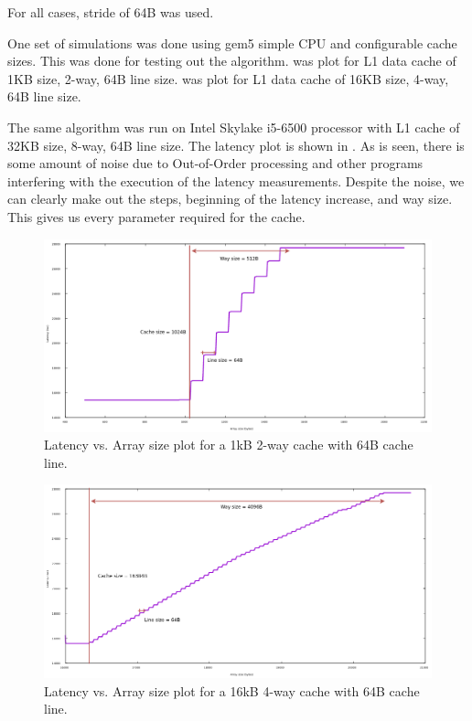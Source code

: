 For all cases, stride of 64B was used.

One set of simulations was done using gem5 simple CPU and configurable cache sizes. This was done for testing out
the algorithm.  was plot for L1 data cache of 1KB size, 2-way, 64B line size. 
was plot for L1 data cache of 16KB size, 4-way, 64B line size.

The same algorithm was run on Intel Skylake i5-6500 processor with L1 cache of 32KB size, 8-way, 64B line size. The latency
plot is shown in . As is seen, there is some amount of noise due to Out-of-Order processing and
other programs interfering with the execution of the latency measurements. Despite the noise, we can clearly make out
the steps, beginning of the latency increase, and way size. This gives us every parameter required for the cache.

\begin{figure}[h]
\centering
\includegraphics[width=\textwidth]{reverse_eng_1kb}
\caption[1KB cache stride access]{Latency vs. Array size plot for a 1kB 2-way cache with 64B cache line.}
\label{fig:gem5_cache}
\end{figure}

\begin{figure}[h]
\centering
\includegraphics[width=\textwidth]{reverse_eng_16kb}
\caption[1KB cache stride access]{Latency vs. Array size plot for a 16kB 4-way cache with 64B cache line.}
\label{fig:gem5_cache2}
\end{figure}

